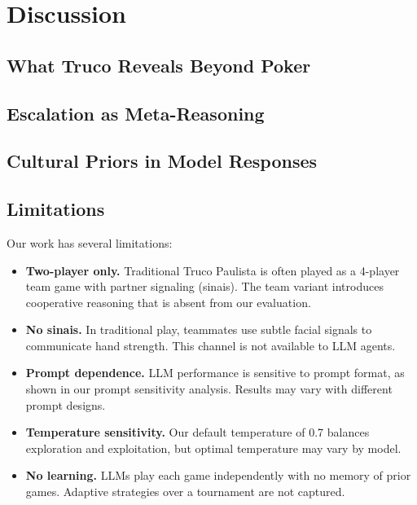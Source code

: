 \section{Discussion}

\subsection{What Truco Reveals Beyond Poker}


\subsection{Escalation as Meta-Reasoning}


\subsection{Cultural Priors in Model Responses}


\subsection{Limitations}

Our work has several limitations:
\begin{itemize}
    \item \textbf{Two-player only.} Traditional Truco Paulista is often played as a 4-player team game with partner signaling (sinais). The team variant introduces cooperative reasoning that is absent from our evaluation.
    \item \textbf{No sinais.} In traditional play, teammates use subtle facial signals to communicate hand strength. This channel is not available to LLM agents.
    \item \textbf{Prompt dependence.} LLM performance is sensitive to prompt format, as shown in our prompt sensitivity analysis. Results may vary with different prompt designs.
    \item \textbf{Temperature sensitivity.} Our default temperature of 0.7 balances exploration and exploitation, but optimal temperature may vary by model.
    \item \textbf{No learning.} LLMs play each game independently with no memory of prior games. Adaptive strategies over a tournament are not captured.
\end{itemize}

